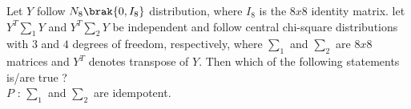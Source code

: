 \iffalse
\chapter{2021}
\author{AI24BTECH11004}
\section{st}
\fi

       \item Let $Y$ follow $N_8\brak{0,I_8}$ distribution, where $I_8$ is the $8x8$ identity matrix. let $Y^T\sum_1 Y$ and $Y^T\sum_2 Y$ be independent and follow central chi-square distributions with $3$ and $4$ degrees of freedom, respectively, where $\sum _1$ and $\sum_2$ are $8x8$ matrices and $Y^T$ denotes transpose of $Y$. Then which of the following statements is/are true  ?\\
       $P$ : $\sum_1$ and $\sum_2$ are idempotent.\\
